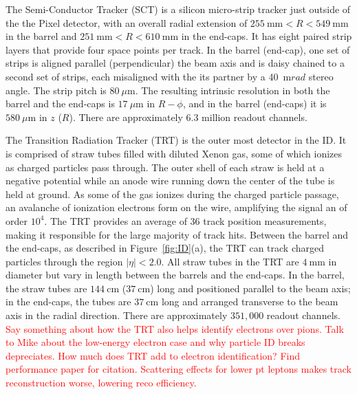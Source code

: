 The Semi-Conductor Tracker (SCT) is a silicon micro-strip tracker just outside of the the Pixel detector, with an overall radial extension of $255~\mathrm{mm} < R < 549~\mathrm{mm}$ in the barrel and $251~\mathrm{mm} < R < 610~\mathrm{mm}$ in the end-caps.  It has eight paired strip layers that provide four space points per track.  In the barrel (end-cap), one set of strips is aligned parallel (perpendicular) the beam axis and is daisy chained to a second set of strips, each misaligned with the its partner by a 40~$\mathrm{m}rad$ stereo angle.  The strip pitch is $80~\mu \mathrm{m}$.  The resulting intrinsic resolution in both the barrel and the end-caps is $17~\mu \mathrm{m}$ in  $R-\phi$, and in the barrel (end-caps) it is $580~\mu \mathrm{m}$ in $z$ ($R$).  There are approximately 6.3 million readout channels.

The Transition Radiation Tracker (TRT) is the outer most detector in the ID.  It is comprised of straw tubes filled with diluted Xenon gas, some of which ionizes as charged particles pass through.   The outer shell of each straw is held at a negative potential while an anode wire running down the center of the tube is held at ground.  As some of the gas ionizes during the charged particle passage, an avalanche of ionization electrons form on the wire, amplifying the signal an of order $10^4$.  The TRT provides an average of 36 track position measurements, making it responsible for the large majority of track hits.   Between the barrel and the end-caps, as described in Figure~\ref{fig:ID}(a), the TRT can track charged particles through the region $|\eta| < 2.0$.  All straw tubes in the TRT are $4~\mathrm{mm}$ in diameter but vary in length between the barrels and the end-caps.  In the barrel, the straw tubes are $144~\mathrm{cm}$ ($37~\mathrm{cm}$) long and positioned parallel to the beam axis; in the end-caps, the tubes are $37~\mathrm{cm}$ long and arranged transverse to the beam axis in the radial direction.  There are approximately $351,000$ readout channels.  \textcolor{red}{Say something about how the TRT also helps identify electrons over pions.  Talk to Mike about the low-energy electron case and why particle ID breaks depreciates.  How much does TRT add to electron identification?  Find performance paper for citation.  Scattering effects for lower pt leptons makes track reconstruction worse, lowering reco efficiency.}

\FloatBarrier
